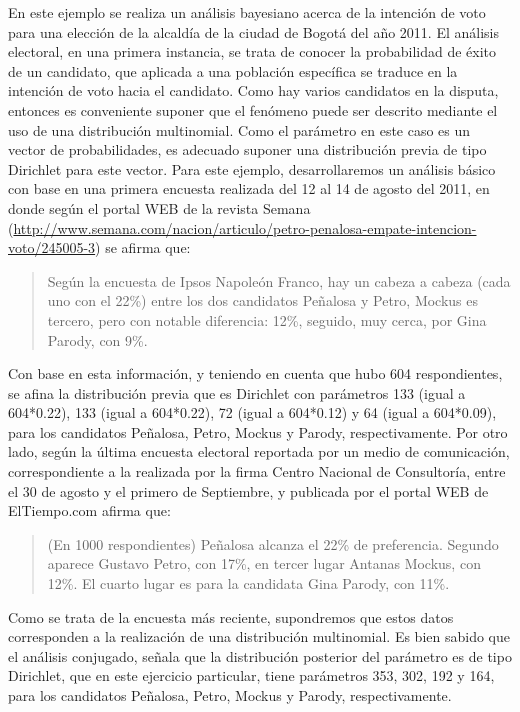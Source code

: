 \documentclass[10pt,openright]{book}\usepackage[]{graphicx}\usepackage[]{color}
\begin{document}
\begin{Eje}\label{Multinomial}
En este ejemplo se realiza un an\'alisis bayesiano acerca de la intenci\'on de voto para una elecci\'on de la alcald\'ia de la ciudad de Bogot\'a del a\~no 2011. El an\'alisis electoral, en una primera instancia, se trata de conocer la probabilidad de \'exito de un candidato, que aplicada a una poblaci\'on espec\'ifica se traduce en la intenci\'on de voto hacia el candidato. Como hay varios candidatos en la disputa, entonces es conveniente suponer que el fen\'omeno puede ser descrito mediante el uso de una distribuci\'on multinomial. Como el par\'ametro en este caso es un vector de probabilidades, es adecuado suponer una distribuci\'on previa de tipo Dirichlet para este vector. Para este ejemplo, desarrollaremos un an\'alisis b\'asico con base en una primera encuesta realizada del 12 al 14 de agosto del 2011, en donde seg\'un el portal WEB de la revista Semana (\url{http://www.semana.com/nacion/articulo/petro-penalosa-empate-intencion-voto/245005-3}) se afirma que:
  
\begin{quote}
Seg\'un la encuesta de Ipsos Napole\'on Franco, hay un cabeza a cabeza (cada uno con el 22\%) entre los dos candidatos Pe\~nalosa y Petro, Mockus es tercero, pero con notable diferencia: 12\%, seguido, muy cerca, por Gina Parody, con 9\%.
\end{quote}

Con base en esta informaci\'on, y teniendo en cuenta que hubo 604 respondientes, se afina la distribuci\'on previa que es Dirichlet con par\'ametros 133 (igual a 604*0.22), 133 (igual a 604*0.22), 72 (igual a 604*0.12) y 64 (igual a 604*0.09), para los candidatos Pe\~nalosa, Petro, Mockus y Parody, respectivamente. Por otro lado, seg\'un la \'ultima encuesta electoral reportada por un medio de comunicaci\'on, correspondiente a la realizada por la firma Centro Nacional de Consultor\'ia, entre el 30 de agosto y el primero de Septiembre, y publicada por el portal WEB de ElTiempo.com afirma que:

\begin{quote}
(En 1000 respondientes) Pe\~nalosa alcanza el 22\% de preferencia. Segundo aparece Gustavo Petro, con 17\%, en tercer lugar Antanas Mockus, con 12\%. El cuarto lugar es para la candidata Gina Parody, con 11\%.
\end{quote}

Como se trata de la encuesta m\'as reciente, supondremos que estos datos corresponden a la realizaci\'on de una distribuci\'on multinomial. Es bien sabido que el an\'alisis conjugado, se\~nala que la distribuci\'on posterior del par\'ametro es de tipo Dirichlet, que en este ejercicio particular, tiene par\'ametros 353, 302, 192 y 164, para los candidatos Pe\~nalosa, Petro, Mockus y Parody, respectivamente. 


\end{Eje}
\end{document}
